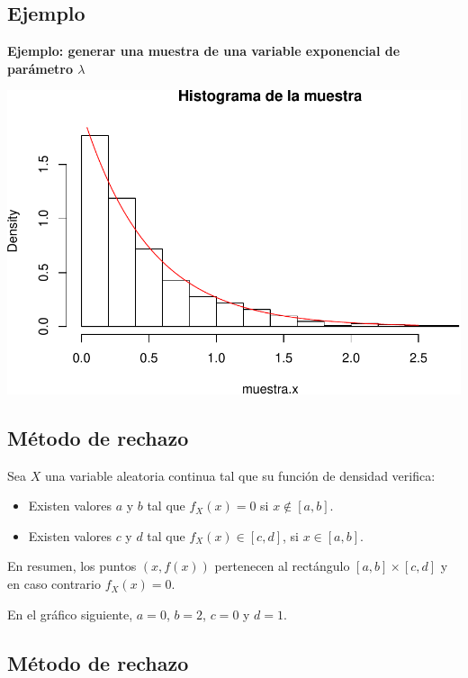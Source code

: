 \documentclass[]{book}
\providecommand{\tightlist}{%
  \setlength{\itemsep}{0pt}\setlength{\parskip}{0pt}}
\begin{document}
\hypertarget{ejemplo-31}{%
\subsection{Ejemplo}\label{ejemplo-31}}

\textbf{Ejemplo: generar una muestra de una variable exponencial de parámetro \(\lambda\)}

\includegraphics{curso-probabilidad-udemy_files/figure-latex/unnamed-chunk-110-1.pdf}

\hypertarget{muxe9todo-de-rechazo}{%
\subsection{Método de rechazo}\label{muxe9todo-de-rechazo}}

Sea \(X\) una variable aleatoria continua tal que su función de densidad verifica:

\begin{itemize}
\tightlist
\item
  Existen valores \(a\) y \(b\) tal que \(f_X(x)= 0\) si \(x\not\in [a,b]\).
\item
  Existen valores \(c\) y \(d\) tal que \(f_X(x)\in [c,d]\), si \(x\in [a,b]\).
\end{itemize}

En resumen, los puntos \((x,f(x))\) pertenecen al rectángulo \([a,b]\times [c,d]\) y en caso contrario \(f_X(x)=0\).

En el gráfico siguiente, \(a=0\), \(b=2\), \(c=0\) y \(d=1\).

\hypertarget{muxe9todo-de-rechazo-1}{%
\subsection{Método de rechazo}\label{muxe9todo-de-rechazo-1}}
\end{document}
